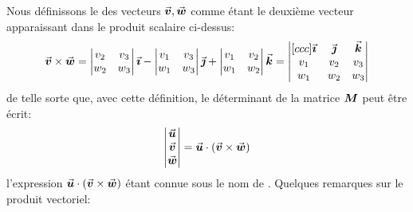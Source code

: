 Nous définissons le  des vecteurs $\vec{\boldsymbol{v}}, \vec{\boldsymbol{w}}$ comme étant
le deuxième vecteur apparaissant dans le produit scalaire ci-dessus:
\[
\vec{\boldsymbol{v}}\times \vec{\boldsymbol{w}} =
 \begin{vmatrix}
v_2 & v_3 \\
w_2 & w_3
\end{vmatrix} \vec{\boldsymbol{\imath}}
- \begin{vmatrix}
v_1 & v_3 \\
w_1 & w_3
\end{vmatrix}\vec{\boldsymbol{\jmath}}
+
 \begin{vmatrix}
v_1 & v_2 \\
w_1 & w_2
\end{vmatrix}\vec{\boldsymbol{k}} =
  \begin{vmatrix}[ccc]
\vec{\boldsymbol{\imath}} &\vec{\boldsymbol{\jmath}} &\vec{\boldsymbol{k}} \\
 v_1 & v_2 & v_3 \\
 w_1 & w_2 & w_3
 \end{vmatrix}
\]
de telle sorte que, avec cette définition, le déterminant de la matrice $\boldsymbol{M}$ peut être écrit:
\[
 \begin{vmatrix}
\vec{\boldsymbol{u}}\\
\vec{\boldsymbol{v}}\\
 \vec{\boldsymbol{w}}
\end{vmatrix} = \vec{\boldsymbol{u}}\cdot (\vec{\boldsymbol{v}} \times \vec{\boldsymbol{w}})
\]
l'expression $\vec{\boldsymbol{u}}\cdot (\vec{\boldsymbol{v}} \times \vec{\boldsymbol{w}})$ étant connue sous le nom de .
Quelques remarques sur le produit vectoriel:
